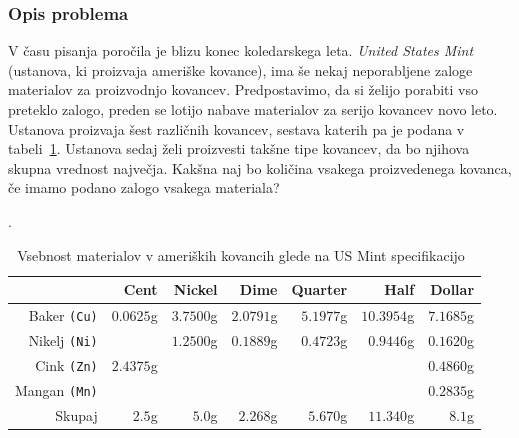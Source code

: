 \documentclass[a4paper,11pt]{article}
\begin{document}
\subsubsection{Opis problema}
V času pisanja poročila je blizu konec koledarskega leta. \textit{United States Mint} (ustanova, ki proizvaja ameriške kovance), ima še nekaj neporabljene zaloge materialov za proizvodnjo kovancev. Predpostavimo, da si želijo porabiti vso preteklo zalogo, preden se lotijo nabave materialov za serijo kovancev novo leto. Ustanova proizvaja šest različnih kovancev, sestava katerih pa je podana v tabeli~\ref{tab:us_coins}. Ustanova sedaj želi proizvesti takšne tipe kovancev, da bo njihova skupna vrednost največja. Kakšna naj bo količina vsakega proizvedenega kovanca, če imamo podano zalogo vsakega materiala?
\begin{table}[hb]
	\centering
	\caption{Vsebnost materialov v ameriških kovancih glede na US Mint specifikacijo~\cite{USMintCoins:2019}}.
	\label{tab:us_coins}
	\begin{tabular}{r r r r r r r}
	 & \textbf{Cent} & \textbf{Nickel} & \textbf{Dime} & \textbf{Quarter} & \textbf{Half} & \textbf{Dollar} \\
	 \hline
	Baker \texttt{(Cu)} & $0.0625$g & $3.7500$g & $2.0791$g & $5.1977$g & $10.3954$g & $7.1685$g \\
	Nikelj \texttt{(Ni)} & & $1.2500$g & $0.1889$g & $0.4723$g & $0.9446$g & $0.1620$g \\
	Cink \texttt{(Zn)} & $2.4375$g & & & & & $0.4860$g \\
	Mangan \texttt{(Mn)} & & & & & & $0.2835$g \\
	\hline	
	Skupaj & $2.5$g & $5.0$g & $2.268$g & $5.670$g & $11.340$g & $8.1$g \\
	\end{tabular}
\end{table}
\end{document}
